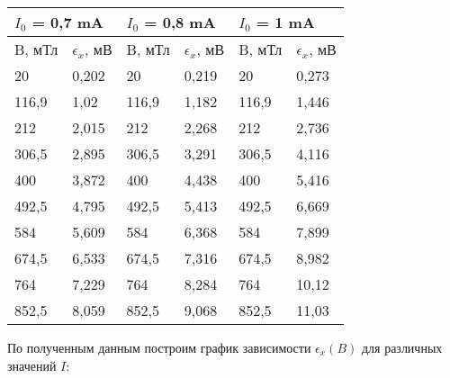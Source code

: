 \documentclass[a4paper, 12pt]{article}
\begin{document}
\begin{center}
\begin{tabular}{|ll|ll|ll|}
\hline
\multicolumn{2}{|l|}{$I_0$ = 0,7 mA}            & \multicolumn{2}{l|}{$I_0$ = 0,8 mA}            & \multicolumn{2}{l|}{$I_0$ = 1 mA}              \\ \hline
\multicolumn{1}{|l|}{B, мТл} & $\epsilon_x$, мВ & \multicolumn{1}{l|}{B, мТл} & $\epsilon_x$, мВ & \multicolumn{1}{l|}{B, мТл} & $\epsilon_x$, мВ \\ \hline
\multicolumn{1}{|l|}{20}     & 0,202            & \multicolumn{1}{l|}{20}     & 0,219            & \multicolumn{1}{l|}{20}     & 0,273           \\ \hline
\multicolumn{1}{|l|}{116,9}  & 1,02             & \multicolumn{1}{l|}{116,9}  & 1,182            & \multicolumn{1}{l|}{116,9}  & 1,446           \\ \hline
\multicolumn{1}{|l|}{212}    & 2,015            & \multicolumn{1}{l|}{212}    & 2,268            & \multicolumn{1}{l|}{212}    & 2,736           \\ \hline
\multicolumn{1}{|l|}{306,5}  & 2,895            & \multicolumn{1}{l|}{306,5}  & 3,291            & \multicolumn{1}{l|}{306,5}  & 4,116           \\ \hline
\multicolumn{1}{|l|}{400}    & 3,872            & \multicolumn{1}{l|}{400}    & 4,438            & \multicolumn{1}{l|}{400}    & 5,416           \\ \hline
\multicolumn{1}{|l|}{492,5}  & 4,795            & \multicolumn{1}{l|}{492,5}  & 5,413            & \multicolumn{1}{l|}{492,5}  & 6,669           \\ \hline
\multicolumn{1}{|l|}{584}    & 5,609            & \multicolumn{1}{l|}{584}    & 6,368            & \multicolumn{1}{l|}{584}    & 7,899           \\ \hline
\multicolumn{1}{|l|}{674,5}  & 6,533            & \multicolumn{1}{l|}{674,5}  & 7,316            & \multicolumn{1}{l|}{674,5}  & 8,982           \\ \hline
\multicolumn{1}{|l|}{764}    & 7,229            & \multicolumn{1}{l|}{764}    & 8,284            & \multicolumn{1}{l|}{764}    & 10,12           \\ \hline
\multicolumn{1}{|l|}{852,5}  & 8,059            & \multicolumn{1}{l|}{852,5}  & 9,068            & \multicolumn{1}{l|}{852,5}  & 11,03           \\ \hline
\end{tabular}
\end{center}
По полученным данным построим график зависимости $\epsilon_x(B)$ для различных значений $I$:
\end{document}
